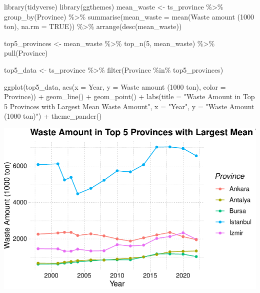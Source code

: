\documentclass[
  11pt,
  a4paper,
  DIV=11,
  numbers=noendperiod]{scrartcl}
\newenvironment{Shaded}{\begin{snugshade}}{\end{snugshade}}
\newcommand{\AttributeTok}[1]{\textcolor[rgb]{0.40,0.45,0.13}{#1}}
\newcommand{\ConstantTok}[1]{\textcolor[rgb]{0.56,0.35,0.01}{#1}}
\newcommand{\DecValTok}[1]{\textcolor[rgb]{0.68,0.00,0.00}{#1}}
\newcommand{\FunctionTok}[1]{\textcolor[rgb]{0.28,0.35,0.67}{#1}}
\newcommand{\NormalTok}[1]{\textcolor[rgb]{0.00,0.23,0.31}{#1}}
\newcommand{\OtherTok}[1]{\textcolor[rgb]{0.00,0.23,0.31}{#1}}
\newcommand{\SpecialCharTok}[1]{\textcolor[rgb]{0.37,0.37,0.37}{#1}}
\newcommand{\StringTok}[1]{\textcolor[rgb]{0.13,0.47,0.30}{#1}}
\begin{document}
\begin{Shaded}
\begin{Highlighting}[]
\FunctionTok{library}\NormalTok{(tidyverse)}
\FunctionTok{library}\NormalTok{(ggthemes)}
\NormalTok{mean\_waste }\OtherTok{\textless{}{-}}\NormalTok{ ts\_province }\SpecialCharTok{\%\textgreater{}\%}
  \FunctionTok{group\_by}\NormalTok{(Province) }\SpecialCharTok{\%\textgreater{}\%}
  \FunctionTok{summarise}\NormalTok{(}\AttributeTok{mean\_waste =} \FunctionTok{mean}\NormalTok{(}\StringTok{\textasciigrave{}}\AttributeTok{Waste amount (1000 ton)}\StringTok{\textasciigrave{}}\NormalTok{, }\AttributeTok{na.rm =} \ConstantTok{TRUE}\NormalTok{)) }\SpecialCharTok{\%\textgreater{}\%}
  \FunctionTok{arrange}\NormalTok{(}\FunctionTok{desc}\NormalTok{(mean\_waste))}

\NormalTok{top5\_provinces }\OtherTok{\textless{}{-}}\NormalTok{ mean\_waste }\SpecialCharTok{\%\textgreater{}\%}
  \FunctionTok{top\_n}\NormalTok{(}\DecValTok{5}\NormalTok{, mean\_waste) }\SpecialCharTok{\%\textgreater{}\%}
  \FunctionTok{pull}\NormalTok{(Province)}

\NormalTok{top5\_data }\OtherTok{\textless{}{-}}\NormalTok{ ts\_province }\SpecialCharTok{\%\textgreater{}\%}
  \FunctionTok{filter}\NormalTok{(Province }\SpecialCharTok{\%in\%}\NormalTok{ top5\_provinces)}

\FunctionTok{ggplot}\NormalTok{(top5\_data, }\FunctionTok{aes}\NormalTok{(}\AttributeTok{x =}\NormalTok{ Year, }\AttributeTok{y =} \StringTok{\textasciigrave{}}\AttributeTok{Waste amount (1000 ton)}\StringTok{\textasciigrave{}}\NormalTok{, }\AttributeTok{color =}\NormalTok{ Province)) }\SpecialCharTok{+}
  \FunctionTok{geom\_line}\NormalTok{() }\SpecialCharTok{+}
  \FunctionTok{geom\_point}\NormalTok{() }\SpecialCharTok{+}
  \FunctionTok{labs}\NormalTok{(}\AttributeTok{title =} \StringTok{"Waste Amount in Top 5 Provinces with Largest Mean Waste Amount"}\NormalTok{,}
       \AttributeTok{x =} \StringTok{"Year"}\NormalTok{,}
       \AttributeTok{y =} \StringTok{"Waste Amount (1000 ton)"}\NormalTok{) }\SpecialCharTok{+}
  \FunctionTok{theme\_pander}\NormalTok{()}
\end{Highlighting}
\end{Shaded}

\includegraphics{project_files/figure-pdf/unnamed-chunk-25-1.pdf}
\end{document}
